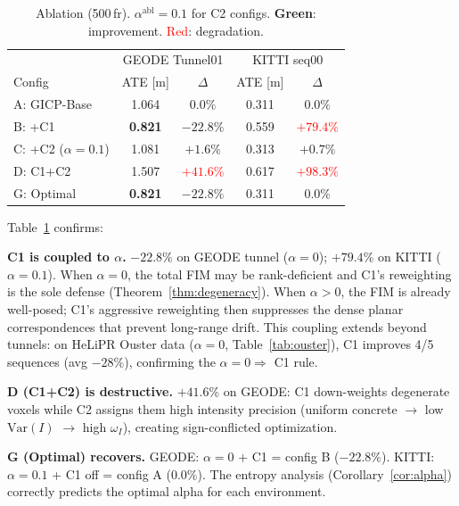 \documentclass[journal,letterpaper,10pt]{IEEEtran}
\newcommand{\best}[1]{\textbf{#1}}
\begin{document}
\begin{table}[t]
\centering
\caption{Ablation (500\,fr). $\alpha^{\mathrm{abl}}{=}0.1$ for C2 configs.
  \textcolor{win}{\textbf{Green}}: improvement. \textcolor{red}{Red}: degradation.}
\label{tab:ablation}
\begin{tabular}{lcccc}
\toprule
 & \multicolumn{2}{c}{GEODE Tunnel01} & \multicolumn{2}{c}{KITTI seq00} \\
Config & ATE [m] & $\Delta$ & ATE [m] & $\Delta$ \\
\midrule
A: GICP-Base        & 1.064 & $0.0\%$   & 0.311 & $0.0\%$ \\
B: +C1              & \best{0.821} & \textcolor{win}{\textbf{$-22.8\%$}} & 0.559 & \textcolor{red}{$+79.4\%$} \\
C: +C2 ($\alpha{=}0.1$) & 1.081 & $+1.6\%$ & 0.313 & $+0.7\%$ \\
D: C1+C2            & 1.507 & \textcolor{red}{$+41.6\%$} & 0.617 & \textcolor{red}{$+98.3\%$} \\
G: Optimal          & \best{0.821} & \textcolor{win}{\textbf{$-22.8\%$}} & 0.311 & $0.0\%$ \\
\bottomrule
\end{tabular}
\end{table}

Table~\ref{tab:ablation} confirms:

\textbf{C1 is coupled to $\alpha$.}
$-22.8\%$ on GEODE tunnel ($\alpha{=}0$); $+79.4\%$ on KITTI ($\alpha{=}0.1$).
When $\alpha{=}0$, the total FIM may be rank-deficient and C1's
reweighting is the sole defense (Theorem~\ref{thm:degeneracy}).
When $\alpha{>}0$, the FIM is already well-posed; C1's aggressive
reweighting then suppresses the dense planar correspondences that
prevent long-range drift.
This coupling extends beyond tunnels: on HeLiPR Ouster data
($\alpha{=}0$, Table~\ref{tab:ouster}), C1 improves 4/5 sequences
(avg $-28\%$), confirming the $\alpha{=}0 \Rightarrow$ C1 rule.

\textbf{D (C1+C2) is destructive.}
$+41.6\%$ on GEODE: C1 down-weights degenerate voxels while C2
assigns them high intensity precision (uniform concrete $\to$ low
$\mathrm{Var}(I)$ $\to$ high $\omega_I$), creating sign-conflicted
optimization.

\textbf{G (Optimal) recovers.}
GEODE: $\alpha{=}0$ + C1 = config B ($-22.8\%$).
KITTI: $\alpha{=}0.1$ + C1 off = config A ($0.0\%$).
The entropy analysis (Corollary~\ref{cor:alpha}) correctly predicts
the optimal alpha for each environment.
\end{document}
